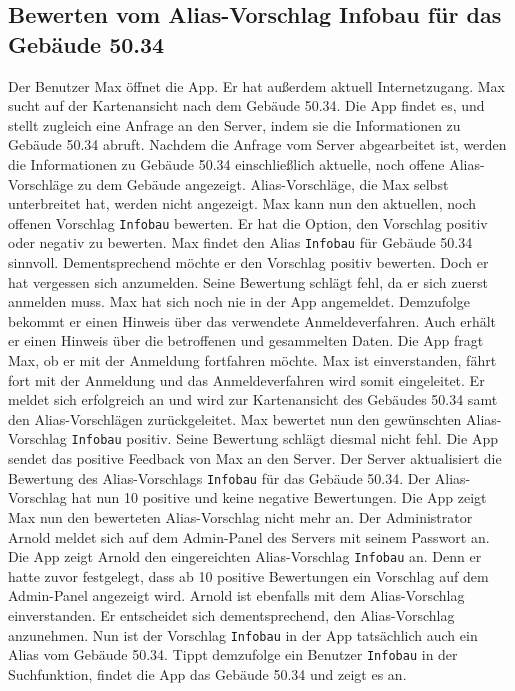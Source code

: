\subsection{Bewerten vom Alias-Vorschlag Infobau für das Gebäude 50.34}

Der Benutzer Max öffnet die App.
Er hat außerdem aktuell Internetzugang.
Max sucht auf der Kartenansicht nach dem Gebäude 50.34.
Die App findet es, und stellt zugleich eine Anfrage an den Server, indem sie die Informationen zu Gebäude 50.34 abruft.
Nachdem die Anfrage vom Server abgearbeitet ist, werden die Informationen zu Gebäude 50.34 einschließlich aktuelle, noch offene Alias-Vorschläge zu dem Gebäude angezeigt.
Alias-Vorschläge, die Max selbst unterbreitet hat, werden nicht angezeigt.
Max kann nun den aktuellen, noch offenen Vorschlag \texttt{Infobau} bewerten.
Er hat die Option, den Vorschlag positiv oder negativ zu bewerten.
Max findet den Alias \texttt{Infobau} für Gebäude 50.34 sinnvoll.
Dementsprechend möchte er den Vorschlag positiv bewerten.
Doch er hat vergessen sich anzumelden.
Seine Bewertung schlägt fehl, da er sich zuerst anmelden muss.
Max hat sich noch nie in der App angemeldet.
Demzufolge bekommt er einen Hinweis über das verwendete Anmeldeverfahren.
Auch erhält er einen Hinweis über die betroffenen und gesammelten Daten.
Die App fragt Max, ob er mit der Anmeldung fortfahren möchte.
Max ist einverstanden, fährt fort mit der Anmeldung und das Anmeldeverfahren wird somit eingeleitet.
Er meldet sich erfolgreich an und wird zur Kartenansicht des Gebäudes 50.34 samt den Alias-Vorschlägen zurückgeleitet.
Max bewertet nun den gewünschten Alias-Vorschlag \texttt{Infobau} positiv.
Seine Bewertung schlägt diesmal nicht fehl.
Die App sendet das positive Feedback von Max an den Server.
Der Server aktualisiert die Bewertung des Alias-Vorschlags \texttt{Infobau} für das Gebäude 50.34.
Der Alias-Vorschlag hat nun 10 positive und keine negative Bewertungen.
Die App zeigt Max nun den bewerteten Alias-Vorschlag nicht mehr an.
Der Administrator Arnold meldet sich auf dem Admin-Panel des Servers mit seinem Passwort an.
Die App zeigt Arnold den eingereichten Alias-Vorschlag \texttt{Infobau} an.
Denn er hatte zuvor festgelegt, dass ab 10 positive Bewertungen ein Vorschlag auf dem Admin-Panel angezeigt wird.
Arnold ist ebenfalls mit dem Alias-Vorschlag einverstanden.
Er entscheidet sich dementsprechend, den Alias-Vorschlag anzunehmen.
Nun ist der Vorschlag \texttt{Infobau} in der App tatsächlich auch ein Alias vom Gebäude 50.34.
Tippt demzufolge ein Benutzer \texttt{Infobau} in der Suchfunktion, findet die App das Gebäude 50.34 und zeigt es an.